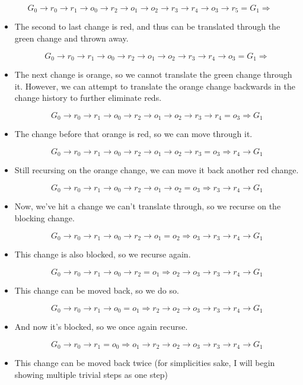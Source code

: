 \documentclass{article}
\newcommand{\insetarrow}[1]{=#1\Rightarrow}
\begin{document}
\[G_0\to r_0\to r_1\to o_0 
\to r_2\to o_1\to o_2\to r_3 
\to r_4\to o_3\to r_5 \insetarrow{G_1}\]
\begin{itemize}
\item The second to last change is red, 
and thus can be translated 
through the green change 
and thrown away.

\[G_0\to r_0\to r_1\to o_0 
\to r_2\to o_1\to o_2\to r_3 
\to r_4\to o_3\insetarrow{G_1}\]

\item The next change is orange, 
so we cannot translate the green change 
through it. 
However, we can attempt 
to translate the orange change 
backwards in the change history 
to further eliminate reds.

\[G_0\to r_0\to r_1\to o_0 
\to r_2\to o_1\to o_2\to r_3 
\to r_4\insetarrow{o_3} G_1\]

\item The change before that orange is red, 
so we can move through it.

\[G_0\to r_0\to r_1\to o_0 
\to r_2\to o_1\to o_2\to r_3 
\insetarrow{o_3} r_4 \to G_1\]

\item Still recursing on the orange change, 
we can move it back another red change.

\[G_0\to r_0\to r_1\to o_0 
\to r_2\to o_1\to o_2 \insetarrow{o_3} 
r_3 \to r_4 \to G_1\]

\item Now, we've hit a change we can't translate through, 
so we recurse on the blocking change.

\[G_0\to r_0\to r_1\to o_0 
\to r_2\to o_1\insetarrow{o_2} o_3 
\to r_3 \to r_4 \to G_1\]

\item This change is also blocked, 
so we recurse again.

\[G_0\to r_0\to r_1\to o_0 
\to r_2\insetarrow{o_1} o_2 \to o_3 
\to r_3 \to r_4 \to G_1\]

\item This change can be moved back, 
so we do so.

\[G_0\to r_0\to r_1\to o_0 
\insetarrow{o_1} r_2 \to o_2 \to o_3 
\to r_3 \to r_4 \to G_1\]

\item And now it's blocked, 
so we once again recurse.

\[G_0\to r_0\to r_1\insetarrow{o_0} 
o_1\to r_2 \to o_2 \to o_3 
\to r_3 \to r_4 \to G_1\]

\item This change can be moved back twice 
(for simplicities sake, 
I will begin showing multiple trivial steps as one step)


\end{itemize}
\end{document}
